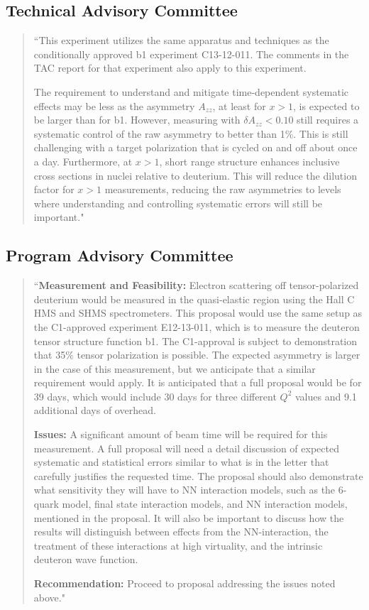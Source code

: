 \subsection{Technical Advisory Committee}

\begin{quote}
``This experiment utilizes the same apparatus and techniques as the conditionally approved b1 experiment C13-12-011. The comments in the TAC report for that experiment also apply to this experiment.

The requirement to understand and mitigate time-dependent systematic effects may be less as the asymmetry $A_{zz}$, at least for $x>1$, is expected to be larger than for b1. 
However, measuring with $\delta A_{zz} < 0.10$ still requires a systematic control of the raw asymmetry to better than 1\%. 
This is still challenging with a target polarization that is cycled on and off about once a day.
Furthermore, at $x>1$, short range structure enhances inclusive cross sections in nuclei relative to deuterium. This will reduce the dilution factor for $x>1$ measurements, reducing the raw asymmetries to levels where understanding and controlling systematic errors will still be important."
\end{quote}

\subsection{Program Advisory Committee}
\begin{quote}
``\textbf{Measurement and Feasibility:} Electron scattering off tensor-polarized deuterium would be measured in the quasi-elastic
region using the Hall C HMS and SHMS spectrometers. This proposal would use the same setup as the C1-approved
experiment E12-13-011, which is to measure the deuteron tensor structure function b1. The C1-approval is subject to
demonstration that 35\% tensor polarization is possible. The expected asymmetry is larger in the case of this measurement,
but we anticipate that a similar requirement would apply. It is anticipated that a full proposal would be for 39 days, which
would include 30 days for three different $Q^2$ values and 9.1 additional days of overhead.

\textbf{Issues:} A significant amount of beam time will be required for this measurement. A full proposal will need a detail
discussion of expected systematic and statistical errors similar to what is in the letter that carefully justifies the requested
time. The proposal should also demonstrate what sensitivity they will have to NN interaction models, such as the 6-quark
model, final state interaction models, and NN interaction models, mentioned in the proposal. It will also be important to
discuss how the results will distinguish between effects from the NN-interaction, the treatment of these interactions at
high virtuality, and the intrinsic deuteron wave function.

\textbf{Recommendation:} Proceed to proposal addressing the issues noted above."
\end{quote}

